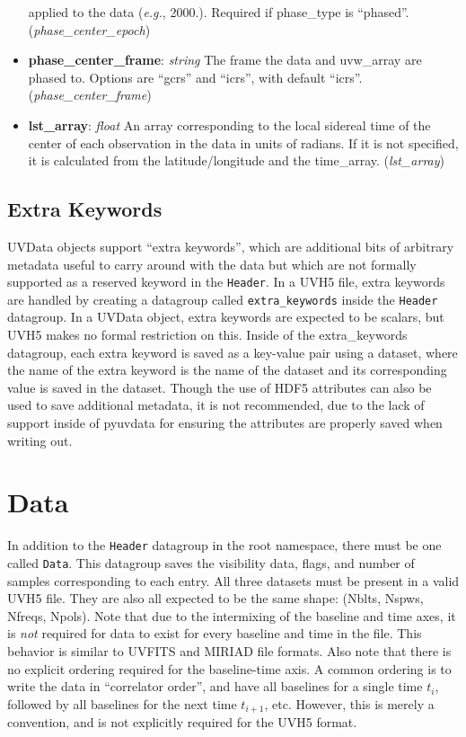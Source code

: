 \documentclass[11pt, oneside]{article}
\begin{document}
\begin{itemize}
  applied to the data (\textit{e.g.}, 2000.). Required if phase\_type is
  ``phased''. (\textit{phase\_center\_epoch})
\item \textbf{phase\_center\_frame}: \textit{string} The frame the data and
  uvw\_array are phased to. Options are ``gcrs'' and ``icrs'', with default
  ``icrs''. (\textit{phase\_center\_frame})
\item \textbf{lst\_array}: \textit{float} An array corresponding to the local
  sidereal time of the center of each observation in the data in units of
  radians. If it is not specified, it is calculated from the latitude/longitude
  and the time\_array. (\textit{lst\_array})
\end{itemize}

\subsection{Extra Keywords}
\label{sec:extra_keywords}
UVData objects support ``extra keywords'', which are additional bits of
arbitrary metadata useful to carry around with the data but which are not
formally supported as a reserved keyword in the \verb+Header+. In a UVH5 file,
extra keywords are handled by creating a datagroup called \verb+extra_keywords+
inside the \verb+Header+ datagroup. In a UVData object, extra keywords are
expected to be scalars, but UVH5 makes no formal restriction on this. Inside of
the extra\_keywords datagroup, each extra keyword is saved as a key-value pair
using a dataset, where the name of the extra keyword is the name of the dataset
and its corresponding value is saved in the dataset. Though the use of HDF5
attributes can also be used to save additional metadata, it is not recommended,
due to the lack of support inside of pyuvdata for ensuring the attributes are
properly saved when writing out.


\section{Data}
\label{sec:data}
In addition to the \verb+Header+ datagroup in the root namespace, there must be
one called \verb+Data+. This datagroup saves the visibility data, flags, and
number of samples corresponding to each entry. All three datasets must be
present in a valid UVH5 file. They are also all expected to be the same shape:
(Nblts, Nspws, Nfreqs, Npols). Note that due to the intermixing of the baseline
and time axes, it is \textit{not} required for data to exist for every baseline
and time in the file. This behavior is similar to UVFITS and MIRIAD file
formats. Also note that there is no explicit ordering required for the
baseline-time axis. A common ordering is to write the data in ``correlator
order'', and have all baselines for a single time $t_i$, followed by all
baselines for the next time $t_{i+1}$, etc. However, this is merely a
convention, and is not explicitly required for the UVH5 format.
\end{document}
